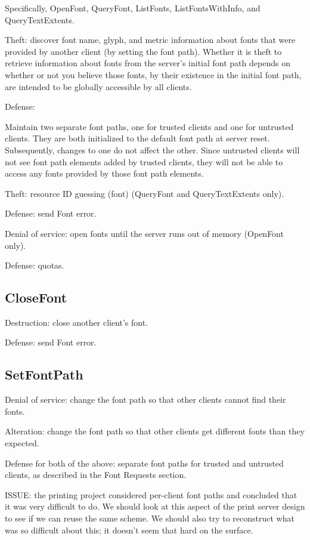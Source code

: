 Specifically, OpenFont, QueryFont, ListFonts, ListFontsWithInfo, and
QueryTextExtents.

Theft: discover font name, glyph, and metric information about fonts
that were provided by another client (by setting the font path).
Whether it is theft to retrieve information about fonts from the
server's initial font path depends on whether or not you believe those
fonts, by their existence in the initial font path, are intended to be
globally accessible by all clients.

Defense:

Maintain two separate font paths, one for trusted clients and one for
untrusted clients.  They are both initialized to the default font path
at server reset.  Subsequently, changes to one do not affect the
other.  Since untrusted clients will not see font path elements added
by trusted clients, they will not be able to access any fonts provided
by those font path elements.

Theft: resource ID guessing (font) (QueryFont and QueryTextExtents only).

Defense: send Font error.

Denial of service: open fonts until the server runs out of memory
(OpenFont only).

Defense: quotas.


\subsection{CloseFont}

Destruction: close another client's font.

Defense: send Font error.



\subsection{SetFontPath}

Denial of service: change the font path so that other clients cannot
find their fonts.

Alteration: change the font path so that other clients get different
fonts than they expected.

Defense for both of the above: separate font paths for trusted and
untrusted clients, as described in the Font Requests section.

ISSUE: the printing project considered per-client font paths and
concluded that it was very difficult to do.  We should look at this
aspect of the print server design to see if we can reuse the same
scheme.  We should also try to reconstruct what was so difficult about
this; it doesn't seem that hard on the surface.



